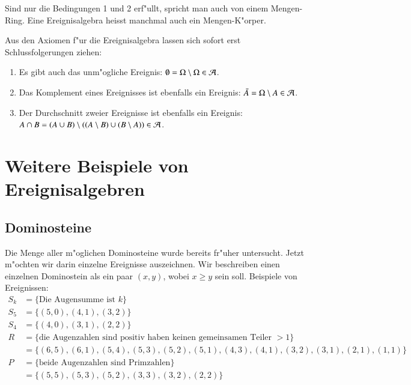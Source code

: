 Sind nur die Bedingungen 1 und 2 erf"ullt, spricht man auch von einem
Mengen-Ring. Eine Ereignisalgebra heisst manchmal auch ein Mengen-K"orper.

Aus den Axiomen f"ur die Ereignisalgebra lassen sich sofort erst
Schlussfolgerungen ziehen:
\begin{enumerate}
\item Es gibt auch das unm"ogliche Ereignis: $\emptyset = \Omega\setminus\Omega\in{\cal A}$.
\item Das Komplement eines Ereignisses ist ebenfalls ein Ereignis: $\bar A=\Omega\setminus A\in{\cal A}$.
\item Der Durchschnitt zweier Ereignisse ist ebenfalls ein Ereignis: $A\cap B = 
(A\cup B) \setminus ((A\setminus B) \cup (B\setminus A))\in{\cal A}$.
\end{enumerate}

\section{Weitere Beispiele von Ereignisalgebren} \label{section-beispiele}
\subsection{Dominosteine}
Die Menge aller m"oglichen Dominosteine wurde bereits fr"uher untersucht.
Jetzt m"ochten wir darin einzelne Ereignisse auszeichnen. Wir beschreiben
einen einzelnen Dominostein als ein paar $(x,y)$, wobei $x\ge y$ sein soll.
Beispiele von Ereignissen:
\begin{align*}
S_k&=\{ \text{Die Augensumme ist $k$}\}\\
S_5&=\{ (5,0), (4,1), (3,2) \}\\
S_4&=\{ (4,0), (3,1), (2,2) \}\\
R&=\{\text{die Augenzahlen sind positiv haben keinen gemeinsamen Teiler $>1$}\}\\
 &=\{ (6,5), (6,1), (5,4), (5,3), (5,2), (5,1), (4,3), (4,1), (3,2), (3,1), (2,1), (1,1) \}
\\
P&=\{\text{beide Augenzahlen sind Primzahlen}\}\\
 &=\{(5,5), (5,3), (5,2), (3,3), (3,2), (2,2) \}\\
\end{align*}

